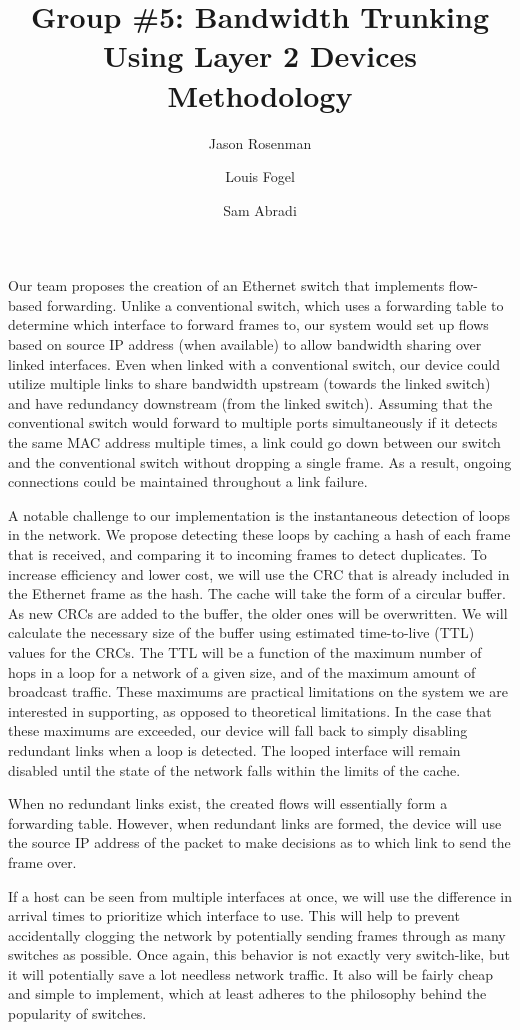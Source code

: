 \documentclass{article}
\title{Group \#5: Bandwidth Trunking Using Layer 2 Devices\\Methodology}
\author{Jason Rosenman \and Louis Fogel \and Sam Abradi}
\date{}
\begin{document}
\maketitle
	Our team proposes the creation of an Ethernet switch that implements flow-based forwarding.
	Unlike a conventional switch, which uses a forwarding table to determine which interface to forward frames to, our system would set up flows based on source IP address (when available) to allow bandwidth sharing over linked interfaces.
	Even when linked with a conventional switch, our device could utilize multiple links to share bandwidth upstream (towards the linked switch) and have redundancy downstream (from the linked switch).
	Assuming that the conventional switch would forward to multiple ports simultaneously if it detects the same MAC address multiple times, a link could go down between our switch and the conventional switch without dropping a single frame.
	As a result, ongoing connections could be maintained throughout a link failure.

	A notable challenge to our implementation is the instantaneous detection of loops in the network.
	We propose detecting these loops by caching a hash of each frame that is received, and comparing it to incoming frames to detect duplicates.
	To increase efficiency and lower cost, we will use the CRC that is already included in the Ethernet frame as the hash.
	The cache will take the form of a circular buffer.
	As new CRCs are added to the buffer, the older ones will be overwritten.
	We will calculate the necessary size of the buffer using estimated time-to-live (TTL) values for the CRCs.
	The TTL will be a function of the maximum number of hops in a loop for a network of a given size, and of the maximum amount of broadcast traffic.
	These maximums are practical limitations on the system we are interested in supporting, as opposed to theoretical limitations.
	In the case that these maximums are exceeded, our device will fall back to simply disabling redundant links when a loop is detected.
	The looped interface will remain disabled until the state of the network falls within the limits of the cache.
	
	When no redundant links exist, the created flows will essentially form a forwarding table.
	However, when redundant links are formed, the device will use the source IP address of the packet to make decisions as to which link to send the frame over.

	If a host can be seen from multiple interfaces at once, we will use the difference in arrival times to prioritize which interface to use.
	This will help to prevent accidentally clogging the network by potentially sending frames through as many switches as possible. Once again, this behavior is not exactly very switch-like, but it will potentially save a lot needless network traffic. 
	It also will be fairly cheap and simple to implement, which at least adheres to the philosophy behind the popularity of switches.
\end{document}
